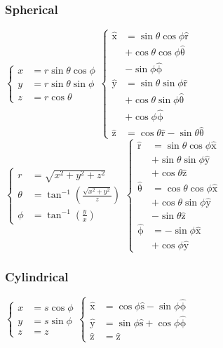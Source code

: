 \documentclass[10pt,landscape,letterpaper]{cheatsheet}
\newcommand{\bv}[1]{\bm{\mathrm{#1}}}
\newcommand{\uv}[1]{\hat{\bv{{#1}}}}
\newcommand{\ux}{\uv{x}}
\newcommand{\uy}{\uv{y}}
\newcommand{\uz}{\uv{z}}
\begin{document}
\subsubsection*{Spherical}
$
        \begin{cases}
                x & =r\sin\theta\cos\phi \\
                y & =r\sin\theta\sin\phi \\
                z & =r\cos\theta
        \end{cases}
        \begin{cases}
                \ux & =\sin\theta\cos\phi\uv{r}               \\
                    & +\cos\theta\cos\phi\uv{\theta}          \\
                    & -\sin\phi\uv{\phi}                      \\
                \uy & =\sin\theta\sin\phi\uv{r}               \\
                    & +\cos\theta\sin\phi\uv{\theta}          \\
                    & +\cos\phi\uv{\phi}                      \\
                \uz & =\cos\theta\uv{r}-\sin\theta\uv{\theta}
        \end{cases}
$
$
        \begin{cases}
                r      & =\sqrt{x^2+y^2+z^2}                  \\
                \theta & =\tan^{-1}(\frac{\sqrt{x^2+y^2}}{z}) \\
                \phi   & =\tan^{-1}(\frac{y}{x})
        \end{cases}
        \begin{cases}
                \uv{r}      & =\sin\theta\cos\phi\ux \\
                            & +\sin\theta\sin\phi\uy \\
                            & +\cos\theta\uz         \\
                \uv{\theta} & =\cos\theta\cos\phi\ux \\
                            & +\cos\theta\sin\phi\uy \\
                            & -\sin\theta\uz         \\
                \uv{\phi}   & =-\sin\phi\ux          \\
                            & +\cos\phi\uy
        \end{cases}
$
\subsubsection*{Cylindrical}
$
\begin{cases}
        x&=s\cos\phi\\
        y&=s\sin\phi\\
        z&=z
\end{cases}
\begin{cases}
        \ux&=\cos\phi\uv{s}-\sin\phi\uv{\phi}\\
        \uy&=\sin\phi\uv{s}+\cos\phi\uv{\phi}\\
        \uv{z}&=\uv{z}
\end{cases}
$
\end{document}
